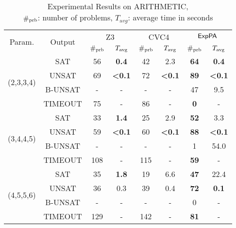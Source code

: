 \begin{table*}[ht]
        \caption{Experimental Results on ARITHMETIC, \\
    $\#_{\rm prb}$: number of problems, $T_{\mathrm avg}$: average time in seconds}
    \centering
    \renewcommand{\arraystretch}{1.2}
    \begin{tabular}{|c|c|c|c|c|c|c|c|}
    \hline
        \multirow{2}{*}{Param. }  & \multirow{2}{*}{Output} & \multicolumn{2}{c|}{Z3} & \multicolumn{2}{c|}{CVC4} & \multicolumn{2}{c|}{${\sf ExpPA}$} \\
        \cline{3-8}
        &  & $\#_{\rm prb}$ & $T_{\rm avg}$  & $\#_{\rm prb}$ & $T_{\rm avg}$  & $\#_{\rm prb}$ & $T_{\rm avg}$  \\ \hline
        \multirow{4}{*}{(2,3,3,4)} & SAT & 56 & {\bf 0.4} & 42 & 2.3 & {\bf 64} & {\bf 0.4} \\
        \cline{2-8}
         & UNSAT & 69 & {\bf \textless{}0.1} & 72 &  {\bf \textless{}0.1} & {\bf 89} & {\bf \textless{}0.1} \\
         \cline{2-8}
         & B-UNSAT & - & - & - & - & 47 & 9.5 \\
         \cline{2-8}
         & TIMEOUT & 75 & - & 86 & - & {\bf 0} & - \\ \hline
         \cline{1-8}
        \multirow{4}{*}{(3,4,4,5)} & SAT & 33 & {\bf 1.4} & 25 & 2.9 & {\bf 52} & 3.3 \\
        \cline{2-8}
         & UNSAT & 59 & {\bf \textless{}0.1} & 60 & {\bf \textless{}0.1} & {\bf 88} & {\bf \textless{}0.1} \\
         \cline{2-8}
         & B-UNSAT & -  & - &  - & -  & 1 & 54.0 \\
         \cline{2-8}
         & TIMEOUT & 108 & - & 115 & - & {\bf 59} & - \\ \hline
         \cline{1-8}
        \multirow{4}{*}{(4,5,5,6)} & SAT & 35 & {\bf 1.8} & 19 & 6.6 & {\bf 47} & 22.4 \\
        \cline{2-8}
         & UNSAT & 36 & 0.3 & 39 & 0.4 & {\bf 72} & {\bf 0.1} \\
         \cline{2-8}
         & B-UNSAT & -  & -  & - & - & 0 & - \\
         \cline{2-8}
         & TIMEOUT & 129 & - & 142 & - & {\bf 81} & -\\
         \hline
        \end{tabular}
            \label{table:arithmetic}
\end{table*}


